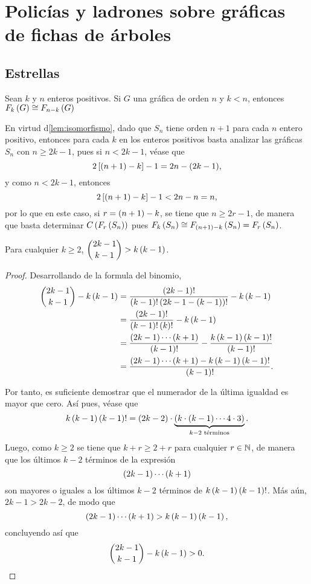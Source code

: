 \chapter{Polic\'ias y ladrones sobre gr\'aficas de fichas de \'arboles}
\label{cap:resultados}

\section{Estrellas}

\begin{lema}
\label{lem:isomorfismo}
    Sean $k$ y $n$ enteros positivos. Si $G$ una gr\'afica de orden $n$ y $k <
    n$, entonces $F_{k}\left( G\right) \cong F_{n-k}\left( G\right)$
\end{lema}

En virtud d\cref{lem:isomorfismo}, dado que $S_n$ tiene orden $n+1$ para
cada $n$ entero positivo, entonces para cada $k$ en los enteros positivos basta
analizar las gr\'aficas $S_n$ con $n\geq 2k-1$, pues si $n<2k-1$, v\'ease que
\[
    2\left[ \left( n+1\right)-k\right]-1 = 2n - (2k-1),
\]
y como $n<2k-1$, entonces
\[
    2\left[ \left( n+1\right)-k\right]-1 < 2n - n = n,
\]
por lo que en este caso, si $r=\left( n+1\right)-k$, se tiene que $n\geq 2r-1$, de
manera que basta determinar $C\left( F_{r}\left( S_n\right)\right)$ pues
$F_{k}\left( S_n\right)\cong F_{\left( n+1\right)-k}\left( S_n\right) = F_{r}\left( S_n\right)$.

\begin{lema}
\label{lem:desigualdad}
    Para cualquier $k\geq 2$, $\displaystyle\binom{2k-1}{k-1} > k\left( k-1\right)$.
\end{lema}

\begin{proof}
    Desarrollando de la formula del binomio,
    \begin{align*}
           \binom{2k-1}{k-1} - k\left( k-1\right)
        &= \frac{\left( 2k-1\right)!}{\left( k-1\right)!\left( 2k-1-\left( k-1\right)\right)!} -
           k\left( k-1\right) \\
        &= \frac{\left( 2k-1\right)!}{\left( k-1\right)!\left( k\right)!} - k\left( k-1\right) \\
        &= \frac{\left( 2k-1\right)\cdots \left( k+1\right)}{\left( k-1\right)!} - \frac{k
           \left( k-1\right)\left( k-1\right)!}{\left( k-1\right)!} \\
        &= \frac{\left( 2k-1\right)\cdots \left( k+1\right) - k\left( k-1\right)
           \left( k-1\right)!}{\left( k-1\right)!}.
    \end{align*}

    Por tanto, es suficiente demostrar que el numerador de la \'ultima igualdad
    es mayor que cero. As\'i pues, v\'ease que
    \[
        k\left( k-1\right)\left( k-1\right)! = \left( 2k-2\right)\cdot \underbrace{\left( k \cdot
        \left( k-1\right)\cdots 4 \cdot 3\right)}_{k-2 \text{ t\'erminos}}.
    \]
    Luego, como $k\geq 2$ se tiene que $k+r \geq 2+r$ para cualquier $r\in\mathbb{N}$,
    de manera que los \'ultimos $k-2$ t\'erminos de la expresi\'on 
    \[
        \left( 2k-1\right)\cdots \left( k+1\right)
    \]
    son mayores o iguales a los \'ultimos $k-2$ t\'erminos de
    $k\left( k-1\right)\left( k-1\right)!$. M\'as a\'un, $2k-1 > 2k-2$, de modo que
    \[
        \left( 2k-1\right)\cdots \left( k+1\right) > k\left( k-1\right)\left( k-1\right),
    \]
    concluyendo as\'i que
    \[
        \binom{2k-1}{k-1} - k\left( k-1\right) > 0.
    \]
\end{proof}

